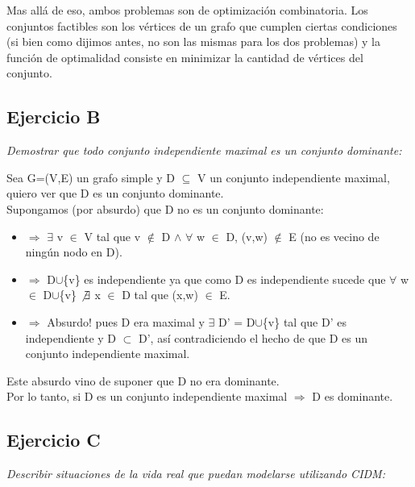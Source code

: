 \medskip

Mas allá de eso, ambos problemas son de optimización combinatoria. Los conjuntos factibles son los vértices de un grafo que cumplen ciertas condiciones (si bien como dijimos antes, no son las mismas para los dos problemas) y la función de optimalidad consiste en minimizar la cantidad de vértices del conjunto.

\newpage

\subsection{Ejercicio B}

\textit{Demostrar que todo conjunto independiente maximal es un conjunto dominante:}

\medskip

Sea G=(V,E) un grafo simple y D $\subseteq$ V un conjunto independiente maximal, quiero ver que D es un conjunto dominante.\\
Supongamos (por absurdo) que D no es un conjunto dominante:
\begin{itemize}
\item[] $\Rightarrow$ $\exists$ v $\in$ V tal que v $\not\in$ D $\wedge$ $\forall$ w $\in$ D, (v,w) $\not\in$ E (no es vecino de ningún nodo en D).
\item[] $\Rightarrow$ D$\cup$\{v\} es independiente ya que como D es independiente sucede que $\forall$ w $\in$ D$\cup$\{v\} $\not\exists$ x $\in$ D tal que (x,w) $\in$ E.
\item[] $\Rightarrow$ Absurdo! pues D era maximal y $\exists$ D' = D$\cup$\{v\} tal que D' es independiente y D $\subset$ D', así contradiciendo el hecho de que D es un conjunto independiente maximal.
\end{itemize}
Este absurdo vino de suponer que D no era dominante.\\
Por lo tanto, si D es un conjunto independiente maximal $\Rightarrow$ D es dominante.

\subsection{Ejercicio C}

\textit{Describir situaciones de la vida real que puedan modelarse utilizando CIDM:}

\medskip

